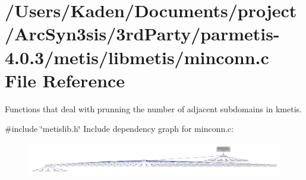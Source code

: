 \hypertarget{a00242}{}\section{/\+Users/\+Kaden/\+Documents/project/\+Arc\+Syn3sis/3rd\+Party/parmetis-\/4.0.3/metis/libmetis/minconn.c File Reference}
\label{a00242}


Functions that deal with prunning the number of adjacent subdomains in kmetis.  


{\ttfamily \#include \char`\"{}metislib.\+h\char`\"{}}\newline
Include dependency graph for minconn.\+c\+:\nopagebreak
\begin{figure}[H]
\begin{center}
\leavevmode
\includegraphics[width=350pt]{a00243}
\end{center}
\end{figure}
